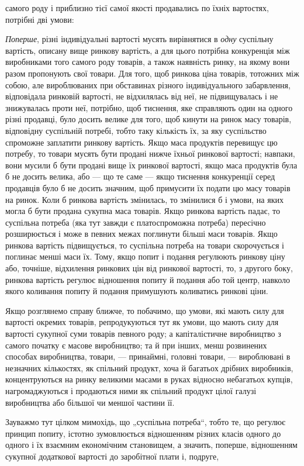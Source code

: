\parcont{}  %
самого роду і приблизно тієї самої якості продавались по їхніх
вартостях, потрібні дві умови:

\emph{Поперше}, різні індивідуальні вартості мусять вирівнятися
в \emph{одну} суспільну вартість, описану вище ринкову вартість, а для
цього потрібна конкуренція між виробниками того самого роду
товарів, а також наявність ринку, на якому вони разом пропонують свої товари. Для того, щоб ринкова
ціна товарів, тотожних між собою, але вироблюваних при обставинах різного
індивідуального забарвлення, відповідала ринковій вартості, не
відхилялась від неї, не підвищувалась і не знижувалась проти
неї, потрібно, щоб тиснення, яке справляють один на одного
різні продавці, було досить велике для того, щоб кинути на
ринок масу товарів, відповідну суспільній потребі, тобто таку
кількість їх, за яку суспільство спроможне заплатити ринкову
вартість. Якщо маса продуктів перевищує цю потребу, то товари мусять бути продані нижче їхньої
ринкової вартості; навпаки,
вони мусили б бути продані вище їх ринкової вартості, якщо
маса продуктів була б не досить велика, або — що те саме — якщо тиснення конкуренції серед продавців
було б не досить
значним, щоб примусити їх подати цю масу товарів на ринок.
Коли б ринкова вартість змінилась, то змінилися б і умови,
на яких могла б бути продана сукупна маса товарів. Якщо ринкова вартість падає, то суспільна потреба
(яка тут завжди
є платоспроможна потреба) пересічно розширюється і може
в певних межах поглинути більші маси товарів. Якщо ринкова
вартість підвищується, то суспільна потреба на товари скорочується і поглинає менші маси їх. Тому,
якщо попит і подання
регулюють ринкову ціну або, точніше, відхилення ринкових цін
від ринкової вартості, то, з другого боку, ринкова вартість регулює відношення попиту й подання або
той центр, навколо
якого коливання попиту й подання примушують коливатись
ринкові ціни.

Якщо розглянемо справу ближче, то побачимо, що умови,
які мають силу для вартості окремих товарів, репродукуються
тут як умови, що мають силу для вартості сукупної суми товарів певного роду; а капіталістичне
виробництво з самого
початку є масове виробництво; та й при інших, менш розвинених способах виробництва, товари, —
принаймні, головні товари, — вироблювані в незначних кількостях, як спільний продукт, хоча й
багатьох дрібних виробників, концентруються на ринку великими масами в руках відносно небагатьох
купців,
нагромаджуються і продаються ними як спільний продукт цілої
галузі виробництва або більшої чи меншої частини її.

Зауважмо тут цілком мимохідь, що „суспільна потреба“,
тобто те, що регулює принцип попиту, істотно зумовлюється
відношенням різних класів одного до одного і їх взаємним
економічним становищем, а значить, поперше, відношенням сукупної додаткової вартості до заробітної
плати і, подруге,
\parbreak{}  %

